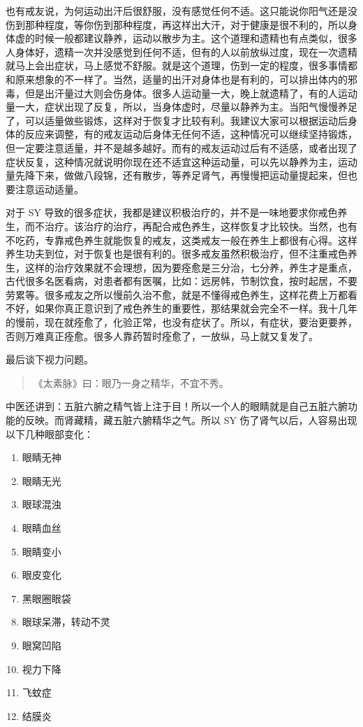 \documentclass[fontset=founder]{ctexart}
\begin{document}
也有戒友说，为何运动出汗后很舒服，没有感觉任何不适。这只能说你阳气还是没伤到那种程度，等你伤到那种程度，再这样出大汗，对于健康是很不利的，所以身体虚的时候一般都建议静养，运动以散步为主。这个道理和遗精也有点类似，很多人身体好，遗精一次并没感觉到任何不适，但有的人以前放纵过度，现在一次遗精就马上会出症状，马上感觉不舒服。就是这个道理，伤到一定的程度，很多事情都和原来想象的不一样了。当然，适量的出汗对身体也是有利的，可以排出体内的邪毒，但是出汗量过大则会伤身体。很多人运动量一大，晚上就遗精了，有的人运动量一大，症状出现了反复，所以，当身体虚时，尽量以静养为主。当阳气慢慢养足了，可以适量做些锻炼，这样对于恢复才比较有利。我建议大家可以根据运动后身体的反应来调整，有的戒友运动后身体无任何不适，这种情况可以继续坚持锻炼，但一定要注意适量，并不是越多越好。而有的戒友运动过后有不适感，或者出现了症状反复，这种情况就说明你现在还不适宜这种运动量，可以先以静养为主，运动量先降下来，做做八段锦，还有散步，等养足肾气，再慢慢把运动量提起来，但也要注意运动适量。

对于 SY 导致的很多症状，我都是建议积极治疗的，并不是一味地要求你戒色养生，而不治疗。该治疗的治疗，再配合戒色养生，这样恢复才比较快。当然，也有不吃药，专靠戒色养生就能恢复的戒友，这类戒友一般在养生上都很有心得。这样养生功夫到位，对于恢复也是很有利的。很多戒友虽然积极治疗，但不注重戒色养生，这样的治疗效果就不会理想，因为要痊愈是三分治，七分养，养生才是重点，古代很多名医看病，对患者都有医嘱，比如：远房帏，节制饮食，按时起居，不要劳累等。很多戒友之所以慢前久治不愈，就是不懂得戒色养生，这样花费上万都看不好，如果你真正意识到了戒色养生的重要性，那结果就会完全不一样。我十几年的慢前，现在就痊愈了，化验正常，也没有症状了。所以，有症状，要治更要养，否则万难真正痊愈。很多人靠药暂时痊愈了，一放纵，马上就又复发了。

最后谈下视力问题。

\begin{quote}
    《太素脉》曰：眼乃一身之精华，不宜不秀。
\end{quote}

中医还讲到：五脏六腑之精气皆上注于目！所以一个人的眼睛就是自己五脏六腑功能的反映。而肾藏精，藏五脏六腑精华之气。所以 SY 伤了肾气以后，人容易出现以下几种眼部变化：

\begin{enumerate}
    \item 眼睛无神
    \item 眼睛无光
    \item 眼球混浊
    \item 眼睛血丝
    \item 眼睛变小
    \item 眼皮变化
    \item 黑眼圈眼袋
    \item 眼球呆滞，转动不灵
    \item 眼窝凹陷
    \item 视力下降
    \item 飞蚊症
    \item 结膜炎
\end{enumerate}
\end{document}
